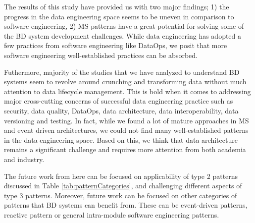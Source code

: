\documentclass{bmcart}
\begin{document}




The results of this study have provided us with two major findings; 1) the progress in the data engineering space seems to be uneven in comparison to software engineering, 2) MS patterns have a great potential for solving some of the BD system development challenges. While data engineering has adopted a few practices from software engineering like DataOps, we posit that more software engineering well-established practices can be absorbed. 

Futhermore, majority of the studies that we have analyzed to understand BD systems seem to revolve around crunching and transforming data without much attention to data lifecycle management. This is bold when it comes to addressing major cross-cutting concerns of successful data engineering practice such as security, data quality, DataOps, data architecture, data interoperability, data versioning and testing. In fact, while we found a lot of mature approaches in MS and event driven architectures, we could not find many well-established patterns in the data engineering space. Based on this, we think that data architecture remains a significant challenge and requires more attention from both academia and industry. 

The future work from here can be focused on applicability of type 2 patterns discussed in Table \ref{tab:patternCategories}, and challenging different aspects of type 3 patterns. Moreover, future work can be focused on other categories of patterns that BD systems can benefit from. These can be event-driven patterns, reactive pattern or general intra-module software engineering patterns.
\end{document}
